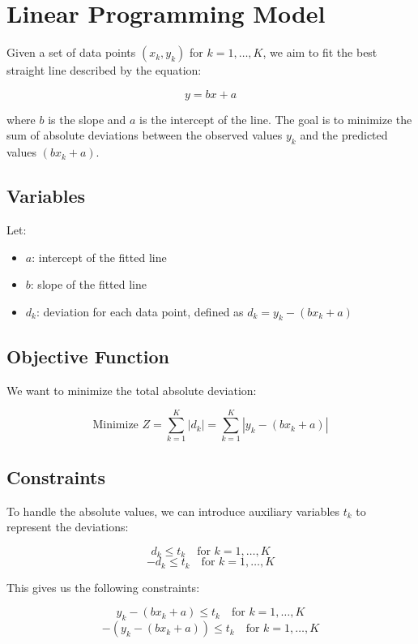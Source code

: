 \documentclass{article}
\begin{document}
\section*{Linear Programming Model}

Given a set of data points \((x_k, y_k)\) for \(k = 1, \ldots, K\), we aim to fit the best straight line described by the equation:

\[
y = bx + a
\]

where \(b\) is the slope and \(a\) is the intercept of the line. The goal is to minimize the sum of absolute deviations between the observed values \(y_k\) and the predicted values \((bx_k + a)\).

\subsection*{Variables}

Let:
\begin{itemize}
    \item \(a\): intercept of the fitted line
    \item \(b\): slope of the fitted line
    \item \(d_k\): deviation for each data point, defined as \(d_k = y_k - (bx_k + a)\)
\end{itemize}

\subsection*{Objective Function}

We want to minimize the total absolute deviation:

\[
\text{Minimize } Z = \sum_{k=1}^{K} |d_k| = \sum_{k=1}^{K} |y_k - (bx_k + a)|
\]

\subsection*{Constraints}

To handle the absolute values, we can introduce auxiliary variables \(t_k\) to represent the deviations:

\[
d_k \leq t_k \quad \text{for } k = 1, \ldots, K
\]
\[
-d_k \leq t_k \quad \text{for } k = 1, \ldots, K
\]

This gives us the following constraints:

\[
y_k - (bx_k + a) \leq t_k \quad \text{for } k = 1, \ldots, K
\]
\[
-(y_k - (bx_k + a)) \leq t_k \quad \text{for } k = 1, \ldots, K
\]
\end{document}
